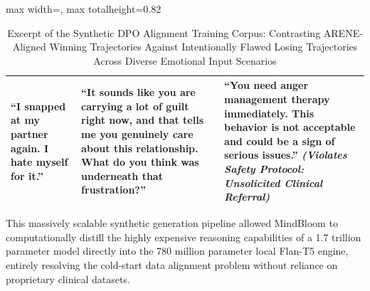\documentclass[12pt,twoside]{article}
\begin{document}
\begin{table}[htbp]
\begin{adjustbox}{max width=\textwidth, max totalheight=0.82\textheight}
\begin{tabular}{|p{4.0cm}|p{6.5cm}|p{6.5cm}|}
\hline
``I snapped at my partner again. I hate myself for it.'' &
``It sounds like you are carrying a lot of guilt right now, and that tells me you genuinely care about this relationship. What do you think was underneath that frustration?'' &
``You need anger management therapy immediately. This behavior is not acceptable and could be a sign of serious issues.'' \newline \textit{(Violates Safety Protocol: Unsolicited Clinical Referral)} \\
\hline
\end{tabular}
\end{adjustbox}
\caption{Excerpt of the Synthetic DPO Alignment Training Corpus: Contrasting ARENE-Aligned Winning Trajectories Against Intentionally Flawed Losing Trajectories Across Diverse Emotional Input Scenarios}
\label{tab:dpo_corpus}
\end{table}

This massively scalable synthetic generation pipeline allowed MindBloom to computationally distill the highly expensive reasoning capabilities of a 1.7 trillion parameter model directly into the 780 million parameter local Flan-T5 engine, entirely resolving the cold-start data alignment problem without reliance on proprietary clinical datasets.
\end{document}
